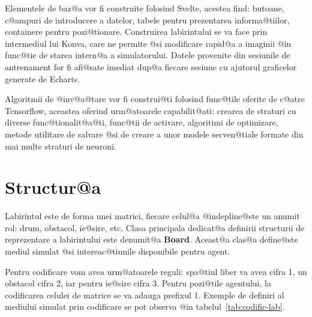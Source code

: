 Elementele de baz@a vor fi construite folosind Svelte, acestea find: butoane, c@ampuri de introducere a datelor, tabele pentru prezentarea informa@tiilor, containere pentru pozi@tionare. Construirea labirintului se va face prin intermediul lui Konva, care ne permite @si modificare rapid@a a imaginii @in func@tie de starea intern@a a simulatorului. Datele provenite din sesiunile de antrenament for fi afi@sate imediat dup@a fiecare sesiune cu ajutorul graficelor generate de Echarts.

Algoritmii de @inv@a@tare vor fi construi@ti folosind func@tile oferite de c@atre Tensorflow, aceastea oferind urm@atoarele capabilit@ati: crearea de straturi cu diverse func@tionalit@a@ti, func@tii de activare, algoritimi de optimizare, metode utilitare de salvare @si de creare a unor modele secven@tiale formate din mai multe straturi de neuroni.

\section{Structur@a}



Labirintul este de forma unei matrici, fiecare celul@a @indepline@ste un anumit rol: drum, obstacol, ie@sire, etc. Clasa principala dedicat@a definirii structurii de reprezentare a la\-bi\-rin\-tului este denumit@a \textbf{Board}. Aceast@a clas@a define@ste mediul simulat @si intereac@tiunile disponibile pentru agent.

Pentru codificare vom avea urm@atoarele reguli: spa@tiul liber va avea cifra 1, un obstacol cifra 2, iar pentru ie@sire cifra 3. Pentru pozi@tile agentului, la codificarea celulei de matrice se va adauga prefixul 1. Exemple de definiri al mediului simulat prin codificare se pot observa @in tabelul~\ref{tab:codific-lab}.


